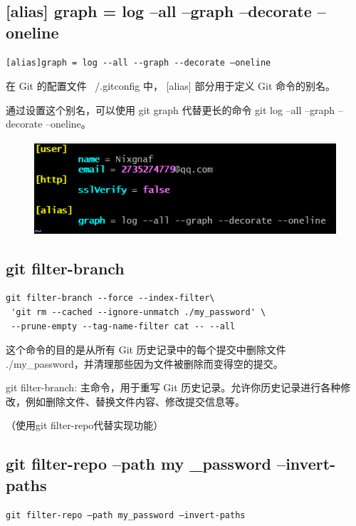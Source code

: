 \documentclass{article}
\begin{document}
\subsection{[alias] graph = log --all --graph --decorate –oneline}
\begin{lstlisting}
[alias]graph = log --all --graph --decorate –oneline
\end{lstlisting}

\noindent 在 Git 的配置文件 ~/.gitconfig 中， [alias] 部分用于定义 Git 命令的别名。

\noindent 通过设置这个别名，可以使用 git graph 代替更长的命令 git log --all --graph --decorate --oneline。
\begin{figure}[h]
    \centering
    \includegraphics[width=1\linewidth]{picture/alias.png}
\end{figure}

\newpage
\subsection{git filter-branch}
\begin{lstlisting}
git filter-branch --force --index-filter\
 'git rm --cached --ignore-unmatch ./my_password' \
 --prune-empty --tag-name-filter cat -- --all

\end{lstlisting}

\noindent 这个命令的目的是从所有 Git 历史记录中的每个提交中删除文件 ./my\_password，并清理那些因为文件被删除而变得空的提交。

\noindent git filter-branch: 主命令，用于重写 Git 历史记录。允许你历史记录进行各种修改，例如删除文件、替换文件内容、修改提交信息等。

\noindent （使用git filter-repo代替实现功能）

\newpage
\subsection{git filter-repo –path my \_password –invert-paths}
\begin{lstlisting}
git filter-repo –path my_password –invert-paths
\end{lstlisting}
\end{document}
